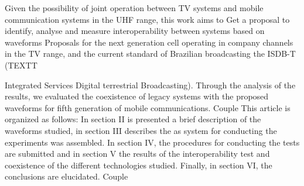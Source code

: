 Given the possibility of joint operation between TV systems and mobile communication systems in the UHF range, this work aims to Get a proposal to identify, analyse and measure interoperability between systems based on waveforms Proposals for the next generation cell operating in company channels in the TV range, and the current standard of Brazilian broadcasting the ISDB-T (TEXTT {Integrated Services Digital terrestrial Broadcasting). Through the analysis of the results, we evaluated the coexistence of legacy systems with the proposed waveforms for fifth generation of mobile communications. Couple
This article is organized as follows: In section II is presented a brief description of the waveforms studied, in section III describes the as system for conducting the experiments was assembled. In section IV, the procedures for conducting the tests are submitted and in section V the results of the interoperability test and coexistence of the different technologies studied. Finally, in section VI, the conclusions are elucidated.  Couple

}
